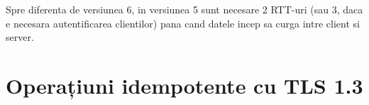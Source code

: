 Spre diferenta de versiunea 6, in versiunea 5 sunt necesare 2 RTT-uri (sau 3, daca e necesara autentificarea clientilor)
pana cand datele incep sa curga intre client si server.

\section{Operațiuni idempotente cu TLS 1.3}

% 
% 
% 
% 
% 
% 
